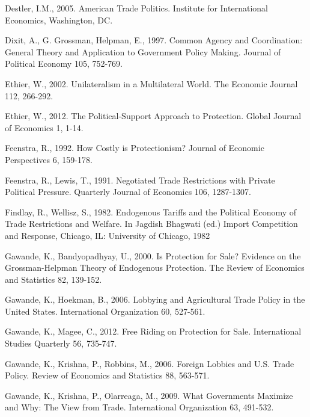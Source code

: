 \documentclass[10pt]{article}
\begin{document}
\begin{list}{}{\setlength{\leftmargin}{0.0in}\setlength{\rightmargin}{0.0in}\setlength{\itemindent}{0.0in}\setlength{\itemsep}{0.1in}}
\item Destler, I.M., 2005. American Trade Politics. Institute for International Economics, Washington, DC.

\item Dixit, A., G. Grossman, Helpman, E., 1997. Common Agency and Coordination: General Theory and Application to Government Policy Making. Journal of Political Economy 105, 752-769.

\item Ethier, W., 2002. Unilateralism in a Multilateral World. The Economic Journal 112, 266-292.

\item Ethier, W., 2012. The Political-Support Approach to Protection. Global Journal of Economics 1, 1-14.

\item Feenstra, R., 1992. How Costly is Protectionism? Journal of Economic Perspectives 6, 159-178.

\item Feenstra, R., Lewis, T., 1991. Negotiated Trade Restrictions with Private Political Pressure. Quarterly Journal of Economics 106, 1287-1307.

\item Findlay, R., Wellisz, S., 1982. Endogenous Tariffs and the Political Economy of Trade Restrictions and Welfare. In Jagdish Bhagwati (ed.) Import Competition and Response, Chicago, IL: University of Chicago, 1982

\item Gawande, K., Bandyopadhyay, U., 2000. Is Protection for Sale? Evidence on the Grossman-Helpman Theory of Endogenous Protection. The Review of Economics and Statistics 82, 139-152.

\item Gawande, K., Hoekman, B., 2006. Lobbying and Agricultural Trade Policy in the United States. International Organization 60, 527-561.

\item Gawande, K., Magee, C., 2012. Free Riding on Protection for Sale. International Studies Quarterly 56, 735-747.

\item Gawande, K., Krishna, P., Robbins, M., 2006. Foreign Lobbies and U.S. Trade Policy. Review of Economics and Statistics 88, 563-571.

\item Gawande, K., Krishna, P., Olarreaga, M., 2009. What Governments Maximize and Why: The View from Trade. International Organization 63, 491-532.


\end{list}
\end{document}
